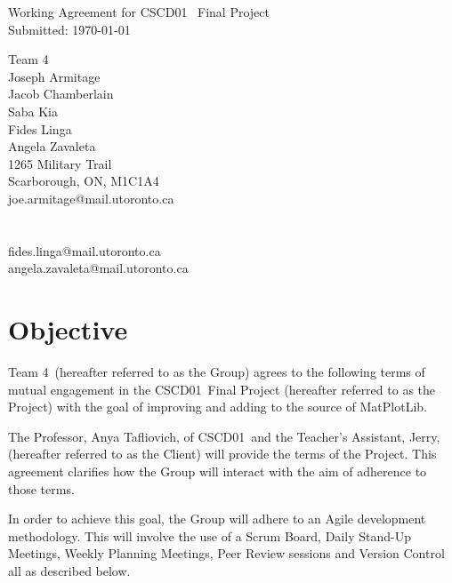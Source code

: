 \documentclass[a4paper,12pt]{article} %
\makeatletter
\newcommand{\YourName}{
Joseph Armitage \\
Jacob Chamberlain \\
Saba Kia \\
Fides Linga \\
Angela Zavaleta}
\newcommand{\CompanyName}{Team 4}
\newcommand{\AddressLineOne}{1265 Military Trail}
\newcommand{\AddressLineTwo}{Scarborough, ON, M1C1A4}
\newcommand{\YourEmail}{
joe.armitage@mail.utoronto.ca \\
 \\
 \\
fides.linga@mail.utoronto.ca \\
angela.zavaleta@mail.utoronto.ca
}
\newcommand{\ClientName}{CSCD01}
\newcommand{\ProfName}{Anya Tafliovich}
\newcommand{\TAName}{Jerry}
\newcommand{\Project}{MatPlotLib}
\makeatother
\begin{document}

\begin{titlepage}

\vspace*{\fill} %

\begin{center}

{\LARGE Working Agreement for \ClientName ~ Final Project}\\ [1.5cm]

Submitted: \today

\end{center}

\CompanyName \\

\YourName \\

\AddressLineOne \\
\AddressLineTwo \\

\YourEmail

\vspace*{\fill} %

\end{titlepage}


\section{Objective}

\CompanyName~(hereafter referred to as the Group) agrees to the following terms of mutual engagement in the \ClientName ~Final Project (hereafter referred to as the Project) with the goal of improving and adding to the source of \Project.

The Professor, \ProfName, of \ClientName~and the Teacher's Assistant, \TAName, (hereafter referred to as the Client) will provide the terms of the Project. This agreement clarifies how the Group will interact with the aim of adherence to those terms.

In order to achieve this goal, the Group will adhere to an Agile development methodology. This will involve the use of a Scrum Board, Daily Stand-Up Meetings, Weekly Planning Meetings, Peer Review sessions and Version Control all as described below.
\end{document}
